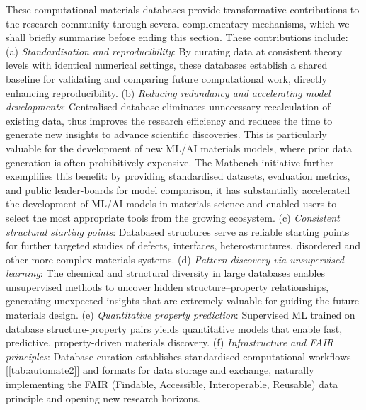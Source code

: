 These computational materials databases provide transformative contributions to the research community through several complementary mechanisms, which we shall briefly summarise before ending this section. These contributions include: (a) \textit{Standardisation and reproducibility}: By curating data at consistent theory levels with identical numerical settings, these databases establish a shared baseline for validating and comparing future computational work, directly enhancing reproducibility. (b) \textit{Reducing redundancy and accelerating model developments}: Centralised database eliminates unnecessary recalculation of existing data, thus improves the research efficiency and reduces the time to generate new insights to advance scientific discoveries. This is particularly valuable  for the development of new ML/AI materials models, where prior data generation is often prohibitively expensive. The Matbench\cite{dunn2020benchmarking} initiative further exemplifies this benefit: by providing standardised datasets, evaluation metrics, and public leader-boards for model comparison, it has substantially accelerated the development of ML/AI models in materials science and enabled users to select the most appropriate tools from the growing ecosystem. (c) \textit{Consistent structural starting points}: Databased structures serve as reliable starting points for further targeted studies of defects, interfaces, heterostructures, disordered and other more complex materials systems. (d) \textit{Pattern discovery via unsupervised learning}: The chemical and structural diversity in large databases enables unsupervised methods to uncover hidden structure--property relationships,\cite{glielmo2021unsupervised,nunez2019exploring,jia2022unsupervised} generating unexpected insights that are extremely valuable for guiding the future materials design. (e) \textit{Quantitative property prediction}: Supervised ML trained on database structure-property pairs yields quantitative models that enable fast, predictive, property-driven materials discovery.\cite{bartel2018physical,mazhnik2020application} (f) \textit{Infrastructure and FAIR principles}: Database curation establishes standardised computational workflows [\cref{tab:automate2}] and formats for data storage and exchange, naturally implementing the FAIR (Findable, Accessible, Interoperable, Reusable) data principle\cite{scheffler2022fair} and opening new research horizons. 
